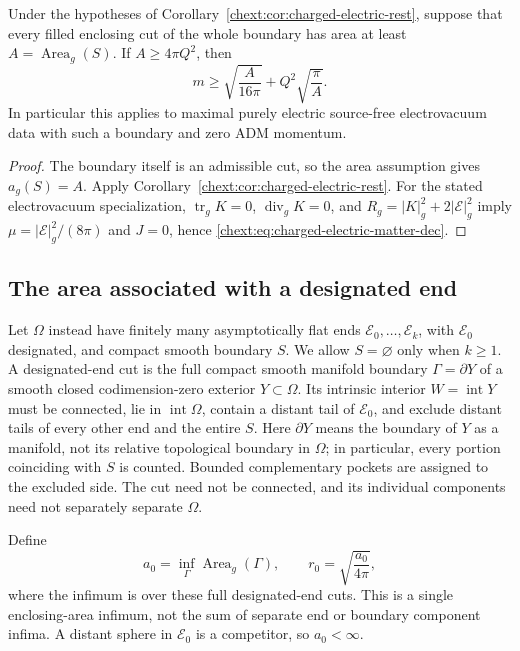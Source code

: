 \begin{corollary}
\label{chext:cor:charged-electric-boundary-area}
Under the hypotheses of Corollary~\ref{chext:cor:charged-electric-rest},
suppose that every filled enclosing cut of the whole boundary has area
at least $A=\operatorname{Area}_g(S)$.  If $A\ge4\pi Q^2$, then
\[
 m\ge\sqrt{\frac{A}{16\pi}}+Q^2\sqrt{\frac{\pi}{A}}.
\]
In particular this applies to maximal purely electric source-free
electrovacuum data with such a boundary and zero ADM momentum.
\end{corollary}

\begin{proof}
The boundary itself is an admissible cut, so the area assumption gives
$a_g(S)=A$.  Apply Corollary~\ref{chext:cor:charged-electric-rest}.
For the stated electrovacuum specialization,
$\operatorname{tr}_gK=0$, $\operatorname{div}_gK=0$, and
$R_g=|K|_g^2+2|\mathcal E|_g^2$ imply
$\mu=|\mathcal E|_g^2/(8\pi)$ and $J=0$, hence
\eqref{chext:eq:charged-electric-matter-dec}.
\end{proof}

\subsection{The area associated with a designated end}

Let $\Omega$ instead have finitely many asymptotically flat ends
$\mathscr E_0,\ldots,\mathscr E_k$, with $\mathscr E_0$ designated,
and compact smooth boundary $S$.  We allow $S=\varnothing$ only when
$k\ge1$.  A designated-end cut is the full compact smooth manifold
boundary $\Gamma=\partial Y$ of a smooth closed codimension-zero
exterior $Y\subset\Omega$.  Its intrinsic interior
$W=\operatorname{int}Y$ must be connected, lie in
$\operatorname{int}\Omega$, contain a distant tail of
$\mathscr E_0$, and exclude distant tails of every other end and
the entire $S$.  Here $\partial Y$ means the boundary of $Y$ as a
manifold, not its relative topological boundary in $\Omega$;
in particular, every portion coinciding with $S$ is counted.
Bounded complementary pockets are assigned to the excluded side.
The cut need not be connected, and its individual components need
not separately separate $\Omega$.

Define
\begin{equation}\label{chext:eq:charged-designated-area}
 a_0=\inf_{\Gamma}\operatorname{Area}_g(\Gamma),\qquad
 r_0=\sqrt{\frac{a_0}{4\pi}},
\end{equation}
where the infimum is over these full designated-end cuts.  This is a
single enclosing-area infimum, not the sum of separate end or boundary
component infima.  A distant sphere in $\mathscr E_0$ is a competitor,
so $a_0<\infty$.

